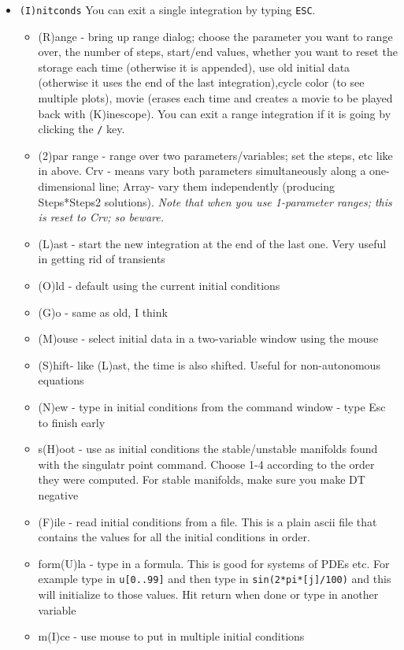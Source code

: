 \documentclass{article}
\begin{document}
\bigskip
{}
\begin{itemize}
\item {\tt (I)nitconds}  You can exit a single integration by typing {\tt ESC}. 
\begin{itemize} 
\item (R)ange - bring up range dialog; choose the parameter you want to range over, the number of steps, start/end values, whether you want to reset the storage each time (otherwise it is appended), use old initial data (otherwise it uses the end of the last integration),cycle color (to see multiple plots), movie (erases each time and creates a movie to be played back with (K)inescope). You can exit a range integration if it is going by clicking the {\tt /} key.
\item (2)par range - range over two parameters/variables; set the steps, etc like in above. Crv - means vary both parameters simultaneously along a one-dimensional line; Array- vary them independently (producing Steps*Steps2 solutions). {\em Note that when you use 1-parameter ranges; this is reset to Crv; so beware.}   
\item (L)ast - start the new integration at the end of the last one. Very useful in getting rid of transients
\item (O)ld - default using the current initial conditions
\item (G)o - same as old, I think
\item (M)ouse - select initial data in a two-variable window using the mouse
\item (S)hift- like (L)ast, the time is also shifted. Useful for non-autonomous equations
\item (N)ew - type in initial conditions from the command window - type Esc to finish early
\item s(H)oot - use as initial conditions the stable/unstable manifolds found with the singulatr point command. Choose 1-4 according to the order they were computed. For stable manifolds, make sure you make DT negative
\item (F)ile - read initial conditions from a file. This is a plain ascii file that contains the values for all the initial conditions in order.
\item  form(U)la - type in a formula. This is good for systems of PDEs etc. For example type in {\tt u[0..99]} and then type in {\tt sin(2*pi*[j]/100)} and this will initialize to those values. Hit return when done or type in another variable
\item m(I)ce - use mouse to put in multiple initial conditions

\end{itemize}
\end{itemize}
\end{document}
